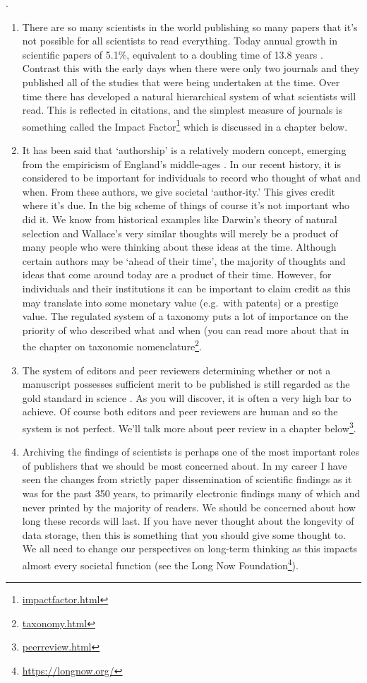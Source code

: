 \documentclass[
]{krantz}
\renewcommand{\href}[2]{#2\footnote{\url{#1}}}
\begin{document}
.

\begin{enumerate}
\def\labelenumi{\arabic{enumi}.}
\item
  There are so many scientists in the world publishing so many papers that it's not possible for all scientists to read everything. Today annual growth in scientific papers of 5.1\%, equivalent to a doubling time of 13.8 years \citep{bornmann2020growth}. Contrast this with the early days when there were only two journals and they published all of the studies that were being undertaken at the time. Over time there has developed a natural hierarchical system of what scientists will read. This is reflected in citations, and the simplest measure of journals is something called the \href{impactfactor.html}{Impact Factor} which is discussed in a chapter below.
\item
  It has been said that `authorship' is a relatively modern concept, emerging from the empiricism of England's middle-ages \citep[see][]{cronin2001hyperauthorship}. In our recent history, it is considered to be important for individuals to record who thought of what and when. From these authors, we give societal `author-ity.' This gives credit where it's due. In the big scheme of things of course it's not important who did it. We know from historical examples like Darwin's theory of natural selection and Wallace's very similar thoughts will merely be a product of many people who were thinking about these ideas at the time. Although certain authors may be `ahead of their time', the majority of thoughts and ideas that come around today are a product of their time. However, for individuals and their institutions it can be important to claim credit as this may translate into some monetary value (e.g.~with patents) or a prestige value. The regulated system of a taxonomy puts a lot of importance on the priority of who described what and when (you can read more about that in the chapter on \href{taxonomy.html}{taxonomic nomenclature}.
\item
  The system of editors and peer reviewers determining whether or not a manuscript possesses sufficient merit to be published is still regarded as the gold standard in science \citep{mayden2012peer}. As you will discover, it is often a very high bar to achieve. Of course both editors and peer reviewers are human and so the system is not perfect. We'll talk more about peer review in a \href{peerreview.html}{chapter below}.
\item
  Archiving the findings of scientists is perhaps one of the most important roles of publishers that we should be most concerned about. In my career I have seen the changes from strictly paper dissemination of scientific findings as it was for the past 350 years, to primarily electronic findings many of which and never printed by the majority of readers. We should be concerned about how long these records will last. If you have never thought about the longevity of data storage, then this is something that you should give some thought to. We all need to change our perspectives on long-term thinking as this impacts almost every societal function (see the \href{https://longnow.org/}{Long Now Foundation}).
\end{enumerate}
\end{document}
